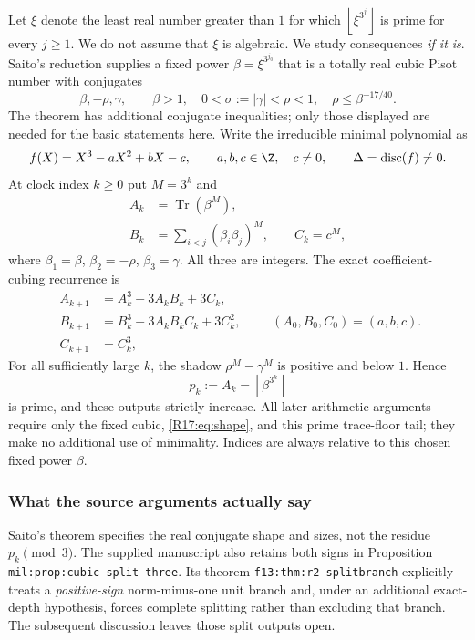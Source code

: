 \documentclass[11pt,a4paper]{article}
\theoremstyle{definition}\newtheorem{definition}[theorem]{Definition}
\theoremstyle{remark}\newtheorem{remark}[theorem]{Remark}
\newcommand{\floor}[1]{\left\lfloor#1\right\rfloor}
\DeclareMathOperator{\Tr}{Tr}\DeclareMathOperator{\tr}{tr}\DeclareMathOperator{\Nm}{N}
\begin{document}
Let $\xi$ denote the least real number greater than $1$ for which
$\floor{\xi^{3^j}}$ is prime for every $j\ge1$. We do not assume that
$\xi$ is algebraic. We study consequences \emph{if it is}.
Saito's reduction \cite[Theorem 1.7 and Section 10]{Saito} supplies a
fixed power $\beta=\xi^{3^{j_0}}$ that is a totally real cubic Pisot
number with conjugates
\begin{equation}\label{R17:eq:shape}
 \beta,-\rho,\gamma,\qquad
 \beta>1,\quad0<\sigma:=|\gamma|<\rho<1,
 \quad\rho\le\beta^{-17/40}.
\end{equation}
The theorem has additional conjugate inequalities; only those displayed
are needed for the basic statements here. Write the irreducible minimal
polynomial as
\[
 f(X)=X^3-aX^2+bX-c,\qquad
 a,b,c\in\Z,\quad c\ne0,
 \qquad\Delta=\operatorname{disc}(f)\ne0.
\]
At clock index $k\ge0$ put $M=3^k$ and
\begin{align*}
 A_k&=\Tr(\beta^M),\\
 B_k&=\sum_{i<j}(\beta_i\beta_j)^M,\qquad C_k=c^M,
\end{align*}
where $\beta_1=\beta$, $\beta_2=-\rho$, $\beta_3=\gamma$.
All three are integers. The exact coefficient-cubing recurrence is
\begin{equation}\label{R17:eq:Newton}
 \begin{split}
 A_{k+1}&=A_k^3-3A_kB_k+3C_k,\\
 B_{k+1}&=B_k^3-3A_kB_kC_k+3C_k^2,\\
 C_{k+1}&=C_k^3,
 \end{split}
 \qquad (A_0,B_0,C_0)=(a,b,c).
\end{equation}
For all sufficiently large $k$, the shadow
$\rho^M-\gamma^M$ is positive and below $1$. Hence
\begin{equation}\label{R17:eq:tail}
 p_k:=A_k=\floor{\beta^{3^k}}
\end{equation}
is prime, and these outputs strictly increase. All later arithmetic
arguments require only the fixed cubic, \eqref{R17:eq:shape}, and this
prime trace-floor tail; they make no additional use of minimality.
Indices are always relative to this chosen fixed power $\beta$.

\subsubsection{What the source arguments actually say}

Saito's theorem specifies the real conjugate shape and sizes, not the
residue $p_k\pmod3$. The supplied manuscript \cite{K031} also
retains both signs in Proposition \texttt{mil:prop:cubic-split-three}.
Its theorem \texttt{f13:thm:r2-splitbranch} explicitly treats a
\emph{positive-sign} norm-minus-one unit branch and, under an additional
exact-depth hypothesis, forces complete splitting rather than excluding
that branch. The subsequent discussion leaves those split outputs open.
\end{document}
